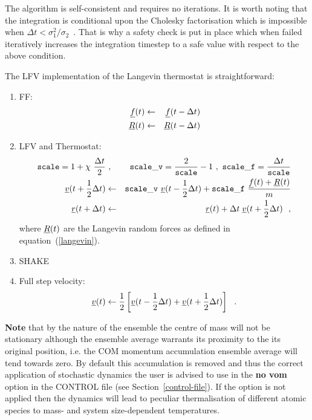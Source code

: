 The algorithm is self-consistent and requires no iterations.
It is worth noting that the integration is conditional upon
the Cholesky factorisation which is impossible when
$\Delta t < \sigma_{1}^{2}/\sigma_{2}$~.  That is why a safety
check is put in place which when failed iteratively increases
the integration timestep to a safe value with respect to the
above condition.

The LFV implementation of the Langevin thermostat is straightforward:
\begin{enumerate}
\item FF:
\begin{eqnarray}
\mbox{$\underline{f}$}(t) &\leftarrow& \mbox{$\underline{f}$}(t - \Delta t) \nonumber \\
\mbox{$\underline{R}$}(t) &\leftarrow& \mbox{$\underline{R}$}(t - \Delta t) \\
\end{eqnarray}
\item LFV and Thermostat:
\begin{eqnarray}
{\tt scale} = 1 + \chi~\frac{\Delta t}{2} &~,~&
{\tt scale\_v} = \frac{2}{\tt scale}-1 ~,~
{\tt scale\_f} = \frac{\Delta t}{\tt scale} \nonumber \\
\mbox{$\underline{v}$}(t + {1 \over 2} \Delta t) &\leftarrow&
{\tt scale\_v}~\mbox{$\underline{v}$}(t - {1 \over 2} \Delta t) +
{\tt scale\_f}~\frac{\mbox{$\underline{f}$}(t) + \mbox{$\underline{R}$}(t)}{m} \\
\mbox{$\underline{r}$}(t + \Delta t) &\leftarrow& \mbox{$\underline{r}$}(t) + \Delta t \;
\mbox{$\underline{v}$}(t + {1 \over 2} \Delta t)~~, \nonumber
\end{eqnarray}
where $\mbox{$\underline{R}$}(t)$ are the Langevin random forces as defined in equation~(\ref{langevin}).
\item SHAKE
\item Full step velocity:
\begin{equation}
\mbox{$\underline{v}$}(t) \leftarrow {1 \over 2} \left[ \mbox{$\underline{v}$}(t - {1 \over 2} \Delta t) +
\mbox{$\underline{v}$}(t + {1 \over 2} \Delta t) \right]~~.
\end{equation}
\end{enumerate}

{\bf Note} that by the nature of the ensemble the centre of mass will
not be stationary although the ensemble average warrants its proximity
to the its original position, i.e. the COM momentum accumulation ensemble
average will tend towards zero.  By default this accumulation is removed
and thus the correct application of stochastic dynamics the user is
advised to use in the {\bf no vom} option in the CONTROL file (see
Section~\ref{control-file}).  If the option is not applied then the
dynamics will lead to peculiar thermalisation of different atomic
species to mass- and system size-dependent temperatures.

